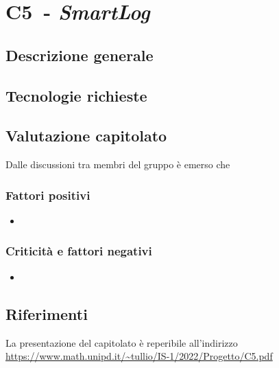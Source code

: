 
\renewcommand{\capName}{\textit{SmartLog}} %
\renewcommand{\capCode}{C5} %
\renewcommand{\capLink}{https://www.math.unipd.it/~tullio/IS-1/2022/Progetto/C5.pdf} %
\renewcommand{\capProposer}{Socomec} %


\section{\capCode\ - \capName} 
\subsection{Descrizione generale}

\subsection{Tecnologie richieste}

\subsection{Valutazione capitolato}
Dalle discussioni tra membri del gruppo è emerso che

\subsubsection{Fattori positivi}

\begin{itemize}
    \item 
\end{itemize}

\subsubsection{Criticità e fattori negativi}

\begin{itemize}
    \item 
\end{itemize}

\subsection{Riferimenti}
La presentazione del capitolato è reperibile all'indirizzo \url{\capLink}